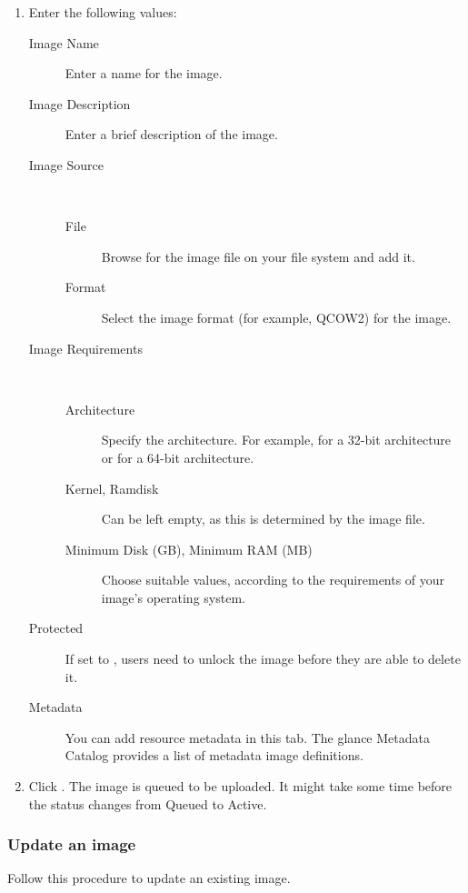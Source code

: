 \begin{enumerate}
\item Enter the following values:
  \begin{description}
  \item[Image Name] Enter a name for the image.
  \item[Image Description] Enter a brief description of the image.
  \item[Image Source]\ 
    \begin{description}
    \item[File] Browse for the image file on your file system and add
      it.
    \item[Format] Select the image format (for example, QCOW2) for the
      image.
    \end{description}
  \item[Image Requirements]\ 
    \begin{description}
    \item[Architecture] Specify the architecture. For example,
      \strong{i386} for a 32-bit architecture or  for
      a 64-bit architecture.
    \item[Kernel, Ramdisk] Can be left empty, as this is determined by
      the image file.
    \item[Minimum Disk (GB), Minimum RAM (MB)] Choose suitable values,
      according to the requirements of your image's operating system.
    \end{description}
  \item[Protected] If set to \strong{Yes}, users need to unlock the
    image before they are able to delete it.
  \item[Metadata] You can add resource metadata in this tab. The
    glance Metadata Catalog provides a list of metadata image
    definitions.
  \end{description}
\item Click .
  The image is queued to be uploaded. It might take some time before
  the status changes from Queued to Active.
\end{enumerate}

\subsubsection{Update an image}

Follow this procedure to update an existing image.

